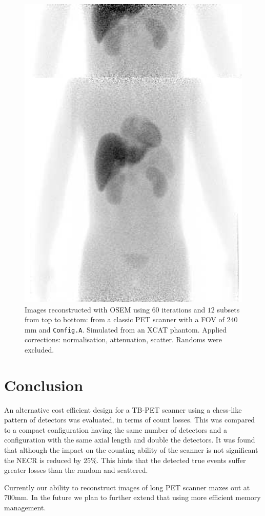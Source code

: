 \documentclass[journal]{IEEEtran}
\begin{document}
\begin{figure}
    \centering
    \includegraphics[width=0.85\linewidth]{recs.png}
    \caption{Images reconstructed with OSEM using $60$ iterations and $12$ subsets from top to bottom: from a classic PET scanner with a FOV of $240$mm and \texttt{Config.A}. Simulated from an XCAT phantom. Applied corrections: normalisation, attenuation, scatter. Randoms were excluded.}
    \label{fig:recs}
\end{figure}

\section{Conclusion}
An alternative cost efficient design for a TB-PET scanner using a chess-like pattern of detectors was evaluated, in terms of count losses. This was compared to a compact configuration having the same number of detectors and a configuration with the same axial length and double the detectors. It was found that although the impact on the counting ability of the scanner is not significant the NECR is reduced by $25\%$. This hints that the detected true events suffer greater losses than the random and scattered. 

Currently our ability to reconstruct images of long PET scanner maxes out at $700$mm. In the future we plan to further extend that using more efficient memory management. 

\AtNextBibliography{\small}
\printbibliography
\end{document}
